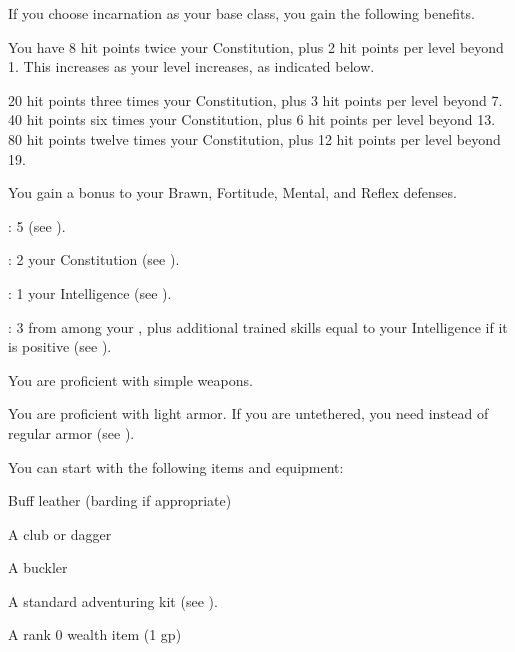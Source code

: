     If you choose incarnation as your base class, you gain the following benefits.

      You have 8 hit points \add twice your Constitution, plus 2 hit points per level beyond 1.
      This increases as your level increases, as indicated below.
      \begin{raggeditemize}
         20 hit points \add three times your Constitution, plus 3 hit points per level beyond 7.
         40 hit points \add six times your Constitution, plus 6 hit points per level beyond 13.
         80 hit points \add twelve times your Constitution, plus 12 hit points per level beyond 19.
      \end{raggeditemize}

      You gain a  bonus to your Brawn, Fortitude, Mental, and Reflex defenses.

      \begin{raggeditemize}
          \item {}: 5 (see ).
          \item {}: 2 \add your Constitution (see ).
          \item {}: 1 \add your Intelligence (see ).
          \item {}: 3 from among your , plus additional trained skills equal to your Intelligence if it is positive (see ).
      \end{raggeditemize}

      You are proficient with simple weapons.

      You are proficient with light armor.
      If you are untethered, you need  instead of regular armor (see ).

    You can start with the following items and equipment:
    \begin{raggeditemize}
        \item Buff leather (barding if appropriate)
        \item A club or dagger
        \item A buckler
        \item A standard adventuring kit (see ).
        \item A rank 0 wealth item (1 gp)
    \end{raggeditemize}

